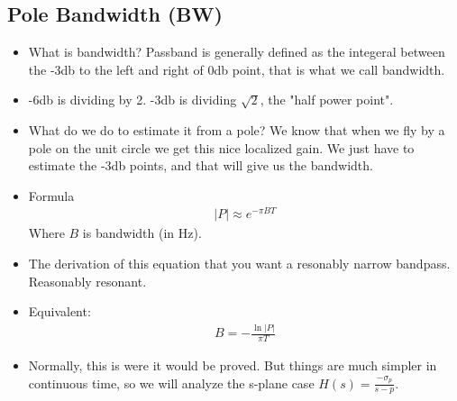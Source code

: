 \subsection*{Pole Bandwidth (BW)}
\begin{itemize}
\item{What is bandwidth? Passband is generally defined as the integeral
between the -3db to the left and right of 0db point, that is what we call
bandwidth.}
\item{
-6db is dividing by 2. -3db is dividing $\sqrt{2}$, the "half power point".
}
\item{
What do we do to estimate it from a pole? We know that when we fly by a pole
on the unit circle we get this nice localized gain. We just have to estimate
the -3db points, and that will give us the bandwidth.
}
\item{
Formula
\begin{align*}
\vert P \vert \approx e^{-\pi B T}
\end{align*}
Where $B$ is bandwidth (in Hz). 
}
\item{
The derivation of this equation that you want a resonably narrow bandpass. 
Reasonably resonant. 
}
\item{
Equivalent:
\begin{align*}
B = - \frac{\ln \vert P \vert}{\pi T}
\end{align*}
}
\item{
Normally, this is were it would be proved. But things are much simpler
in continuous time, so we will analyze the s-plane case 
$H(s) = \frac{-\sigma_p}{s - p}$. 
}
\end{itemize}
%
%
%
%
%
%
%
%
%
%


